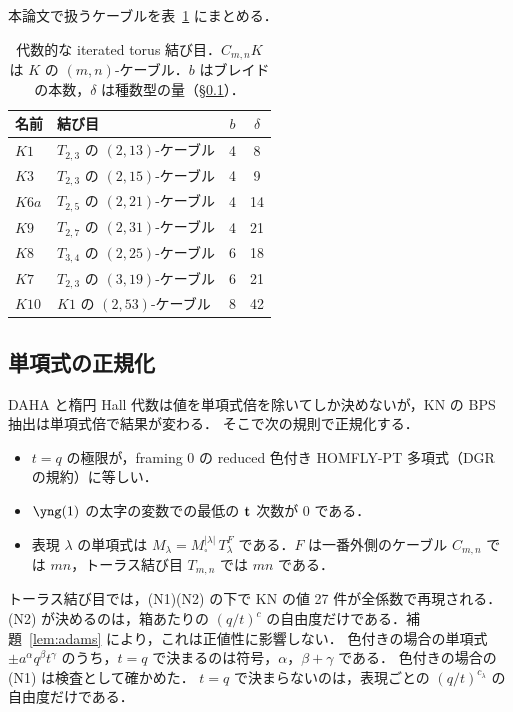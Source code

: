 本論文で扱うケーブルを表~\ref{tab:cables} にまとめる．
\begin{table}[h]
\centering
\caption{代数的な iterated torus 結び目．$C_{m,n}K$ は $K$ の $(m,n)$-ケーブル．$b$ はブレイドの本数，$\delta$ は種数型の量（\S\ref{sec:normalization}）．}\label{tab:cables}
\begin{tabular}{llcc}
\toprule
名前 & 結び目 & $b$ & $\delta$ \\
\midrule
$K1$ & $T_{2,3}$ の $(2,13)$-ケーブル & 4 & 8 \\
$K3$ & $T_{2,3}$ の $(2,15)$-ケーブル & 4 & 9 \\
$K6a$ & $T_{2,5}$ の $(2,21)$-ケーブル & 4 & 14 \\
$K9$ & $T_{2,7}$ の $(2,31)$-ケーブル & 4 & 21 \\
$K8$ & $T_{3,4}$ の $(2,25)$-ケーブル & 6 & 18 \\
$K7$ & $T_{2,3}$ の $(3,19)$-ケーブル & 6 & 21 \\
$K10$ & $K1$ の $(2,53)$-ケーブル & 8 & 42 \\
\bottomrule
\end{tabular}
\end{table}

\subsection{単項式の正規化}\label{sec:normalization}
DAHA と楕円 Hall 代数は値を単項式倍を除いてしか決めないが，KN の BPS 抽出は単項式倍で結果が変わる．
そこで次の規則で正規化する．
\begin{itemize}
\item[(N1)] $t=q$ の極限が，framing 0 の reduced 色付き HOMFLY-PT 多項式（DGR の規約）に等しい．
\item[(N2)] $\yng(1)$ の太字の変数での最低の $\mathbf{t}$ 次数が 0 である．
\item[(N2$'$)] 表現 $\lambda$ の単項式は $M_\lambda=M_\square^{|\lambda|}\,T_\lambda^{F}$ である．$F$ は一番外側のケーブル $C_{m,n}$ では $mn$，トーラス結び目 $T_{m,n}$ では $mn$ である．
\end{itemize}
トーラス結び目では，(N1)(N2) の下で KN の値 27 件が全係数で再現される．
(N2) が決めるのは，箱あたりの $(q/t)^{c}$ の自由度だけである．補題~\ref{lem:adams} により，これは正値性に影響しない．
色付きの場合の単項式 $\pm a^\alpha q^\beta t^\gamma$ のうち，$t=q$ で決まるのは符号，$\alpha$，$\beta+\gamma$ である．
色付きの場合の (N1) は検査として確かめた．
$t=q$ で決まらないのは，表現ごとの $(q/t)^{c_\lambda}$ の自由度だけである．

